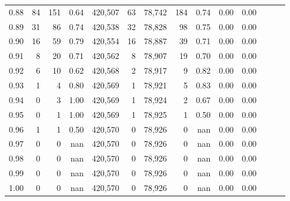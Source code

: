 \begin{tabular}{rrrrrrrrrrrrrr}
0.88 &      84 &    151 &  0.64 &  420,507 &       63 &  78,742 &     184 &  0.74 &  0.00 &      0.00 \\
0.89 &      31 &     86 &  0.74 &  420,538 &       32 &  78,828 &      98 &  0.75 &  0.00 &      0.00 \\
0.90 &      16 &     59 &  0.79 &  420,554 &       16 &  78,887 &      39 &  0.71 &  0.00 &      0.00 \\
0.91 &       8 &     20 &  0.71 &  420,562 &        8 &  78,907 &      19 &  0.70 &  0.00 &      0.00 \\
0.92 &       6 &     10 &  0.62 &  420,568 &        2 &  78,917 &       9 &  0.82 &  0.00 &      0.00 \\
0.93 &       1 &      4 &  0.80 &  420,569 &        1 &  78,921 &       5 &  0.83 &  0.00 &      0.00 \\
0.94 &       0 &      3 &  1.00 &  420,569 &        1 &  78,924 &       2 &  0.67 &  0.00 &      0.00 \\
0.95 &       0 &      1 &  1.00 &  420,569 &        1 &  78,925 &       1 &  0.50 &  0.00 &      0.00 \\
0.96 &       1 &      1 &  0.50 &  420,570 &        0 &  78,926 &       0 &   nan &  0.00 &      0.00 \\
0.97 &       0 &      0 &   nan &  420,570 &        0 &  78,926 &       0 &   nan &  0.00 &      0.00 \\
0.98 &       0 &      0 &   nan &  420,570 &        0 &  78,926 &       0 &   nan &  0.00 &      0.00 \\
0.99 &       0 &      0 &   nan &  420,570 &        0 &  78,926 &       0 &   nan &  0.00 &      0.00 \\
1.00 &       0 &      0 &   nan &  420,570 &        0 &  78,926 &       0 &   nan &  0.00 &      0.00 \\
\bottomrule
\end{tabular}
